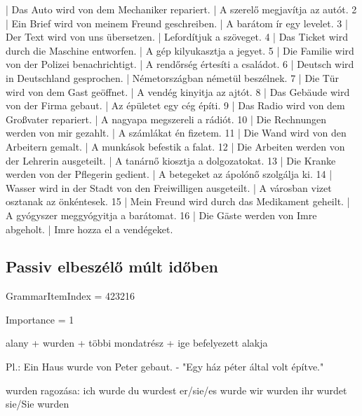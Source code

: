 \documentclass{article}
\newenvironment{desc}{\verbatim}{\endverbatim}
\newenvironment{exmp}{\verbatim}{\endverbatim}
\begin{document}
\begin{exmp}
1 | Das Auto wird von dem Mechaniker repariert. | A szerelő megjavítja az autót.
2 | Ein Brief wird von meinem Freund geschreiben. | A barátom ír egy levelet.
3 | Der Text wird von uns übersetzen. | Lefordítjuk a szöveget.
4 | Das Ticket wird durch die Maschine entworfen. | A gép kilyukasztja a jegyet.
5 | Die Familie wird von der Polizei benachrichtigt. | A rendőrség értesíti a családot.
6 | Deutsch wird in Deutschland gesprochen. | Németországban németül beszélnek.
7 | Die Tür wird von dem Gast geöffnet. | A vendég kinyitja az ajtót.
8 | Das Gebäude wird von der Firma gebaut. | Az épületet egy cég építi.
9 | Das Radio wird von dem Großvater repariert. | A nagyapa megszereli a rádiót.
10 | Die Rechnungen werden von mir gezahlt. | A számlákat én fizetem.
11 | Die Wand wird von den Arbeitern gemalt. | A munkások befestik a falat.
12 | Die Arbeiten werden von der Lehrerin ausgeteilt. | A tanárnő kiosztja a dolgozatokat.
13 | Die Kranke werden von der Pflegerin gedient. | A betegeket az ápolónő szolgálja ki.
14 | Wasser wird in der Stadt von den Freiwilligen ausgeteilt. | A városban vizet osztanak az önkéntesek.
15 | Mein Freund wird durch das Medikament geheilt. | A gyógyszer meggyógyitja a barátomat.
16 | Die Gäste werden von Imre abgeholt. | Imre hozza el a vendégeket.
\end{exmp}

\subsection{Passiv elbeszélő múlt időben}

GrammarItemIndex = 423216

Importance = 1

\begin{desc}
alany + wurden + többi mondatrész + ige befelyezett alakja

Pl.: Ein Haus wurde von Peter gebaut. - "Egy ház péter által volt építve."

wurden ragozása:
ich wurde
du wurdest
er/sie/es wurde
wir wurden
ihr wurdet
sie/Sie wurden
\end{desc}
\end{document}
